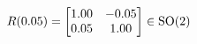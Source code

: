 \documentclass[preview]{standalone}
\begin{document}
\begin{align*}
\special{dvisvgm:raw <g id='unique000'>}R(0.05) = \begin{bmatrix} 1.00 & -0.05 \\ 0.05 & 1.00 \end{bmatrix} \in \text{SO}(2)\special{dvisvgm:raw </g>}
\end{align*}
\end{document}
